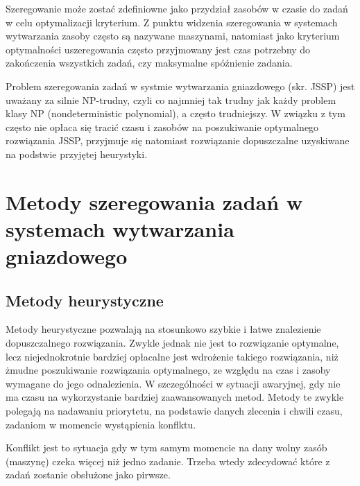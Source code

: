 \documentclass[twoside]{kInzynierka}
\begin{document}
Szeregowanie może zostać zdefiniowne jako przydział zasobów w czasie do zadań w celu optymalizacji kryterium. Z punktu widzenia szeregowania w systemach wytwarzania zasoby często są nazywane maszynami, natomiast jako kryterium optymalności uszeregowania często przyjmowany jest czas potrzebny do zakończenia wszystkich zadań, czy maksymalne spóźnienie zadania. \cite{antColony} 

Problem szeregowania zadań w systmie wytwarzania gniazdowego (skr. JSSP) jest uważany za silnie NP-trudny, czyli co najmniej tak trudny jak każdy problem klasy NP (nondeterministic polynomial), a często trudniejszy. W związku z tym często nie opłaca się tracić czasu i zasobów na poszukiwanie optymalnego rozwiązania JSSP, przyjmuje się natomiast rozwiązanie dopuszczalne uzyskiwane na podstwie przyjętej heurystyki. 
 

\section        [Metody szeregowania zadań \ldots]
		        {Metody szeregowania zadań \newline w systemach wytwarzania gniazdowego}

\subsection     {Metody heurystyczne}
Metody heurystyczne pozwalają na stosunkowo szybkie i łatwe znalezienie dopuszczalnego rozwiązania. Zwykle jednak nie jest to rozwiązanie optymalne, lecz niejednokrotnie bardziej opłacalne jest wdrożenie takiego rozwiązania, niż żmudne poszukiwanie rozwiązania optymalnego, ze względu na czas i zasoby wymagane do jego odnalezienia. W szczególności w sytuacji awaryjnej, gdy nie ma czasu na wykorzystanie bardziej zaawansowanych metod. Metody te zwykle polegają na nadawaniu priorytetu, na podstawie danych zlecenia i chwili czasu, zadaniom w momencie wystąpienia konflktu. 

Konflikt jest to sytuacja gdy w tym samym momencie na dany wolny zasób (maszynę) czeka więcej niż jedno zadanie. Trzeba wtedy zdecydować które z zadań zostanie obsłużone jako pirwsze. 
\end{document}
